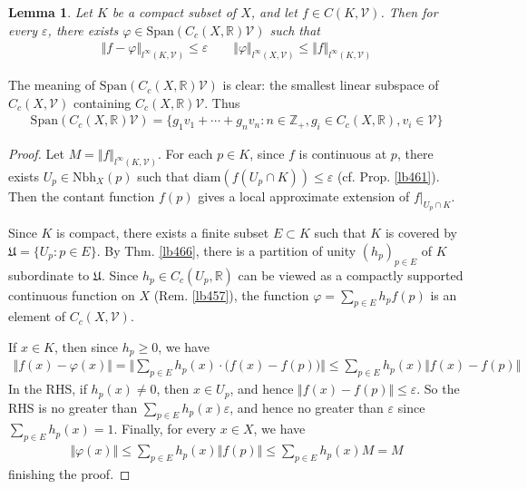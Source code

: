 \documentclass[12pt,b5paper,notitlepage]{article}
\theoremstyle{definition}
\theoremstyle{plain}
\newtheorem{lm}[df]{Lemma}
\newcommand{\fk}{\mathfrak}
\newcommand{\mc}{\mathcal}
\newcommand{\Span}{\mathrm{Span}}
\newcommand{\Zbb}{\mathbb Z}
\newcommand{\Rbb}{\mathbb R}
\newcommand{\Nbh}{\mathrm{Nbh}}
\newcommand{\diam}{\mathrm{diam}}
\newcommand{\eps}{\varepsilon}
\numberwithin{equation}{section}
\begin{document}
\begin{lm}\label{lb469}
Let $K$ be a compact subset of $X$, and let $f\in C(K,\mc V)$. Then for every $\eps$, there exists $\varphi\in \Span(C_c(X,\Rbb)\mc V)$ such that
\begin{align*}
\Vert f-\varphi\Vert_{l^\infty(K,\mc V)}\leq\eps\qquad \Vert \varphi\Vert_{l^\infty(X,\mc V)}\leq \Vert f\Vert_{l^\infty(K,\mc V)}
\end{align*}
\end{lm}

The meaning of $\Span(C_c(X,\Rbb)\mc V)$ is clear: the smallest linear subspace of $C_c(X,\mc V)$ containing $C_c(X,\Rbb)\mc V$. Thus \index{SpanCX@$\Span(C_c(X,\Rbb)\mc V)$}
\begin{align}
\Span(C_c(X,\Rbb)\mc V)=\{g_1v_1+\cdots+g_nv_n:n\in\Zbb_+,g_i\in C_c(X,\Rbb),v_i\in\mc V\}
\end{align}


\begin{proof}
Let $M=\Vert f\Vert_{l^\infty(K,\mc V)}$. For each $p\in K$, since $f$ is continuous at $p$, there exists $U_p\in\Nbh_X(p)$ such that $\diam(f(U_p\cap K))\leq\eps$ (cf. Prop. \ref{lb461}). Then the contant function $f(p)$ gives a local approximate extension of $f|_{U_p\cap K}$.

Since $K$ is compact, there exists a finite subset $E\subset K$ such that $K$ is covered by $\fk U=\{U_p:p\in E\}$. By Thm. \ref{lb466}, there is a partition of unity $(h_p)_{p\in E}$ of $K$ subordinate to $\fk U$. Since $h_p\in C_c(U_p,\Rbb)$ can be viewed as a compactly supported continuous function on $X$ (Rem. \ref{lb457}), the function $\varphi=\sum_{p\in E}h_pf(p)$ is an element of $C_c(X,\mc V)$. 

If $x\in K$, then since $h_p\geq0$, we have
\begin{align*}
\Vert f(x)-\varphi(x)\Vert=\Big\Vert \sum_{p\in E}h_p(x)\cdot \big(f(x)-f(p)\big)  \Big\Vert\leq\sum_{p\in E}h_p(x)\Vert f(x)-f(p)\Vert
\end{align*}
In the RHS, if $h_p(x)\neq 0$, then $x\in U_p$, and hence $\Vert f(x)-f(p)\Vert\leq\eps$. So the RHS is no greater than $\sum_{p\in E}h_p(x)\eps$, and hence no greater than $\eps$ since $\sum_{p\in E}h_p(x)=1$. Finally, for every $x\in X$, we have
\begin{align*}
\Vert \varphi(x)\Vert\leq\sum_{p\in E}h_p(x)\Vert f(p)\Vert\leq \sum_{p\in E}h_p(x)M=M
\end{align*}
finishing the proof.
\end{proof}
\end{document}
